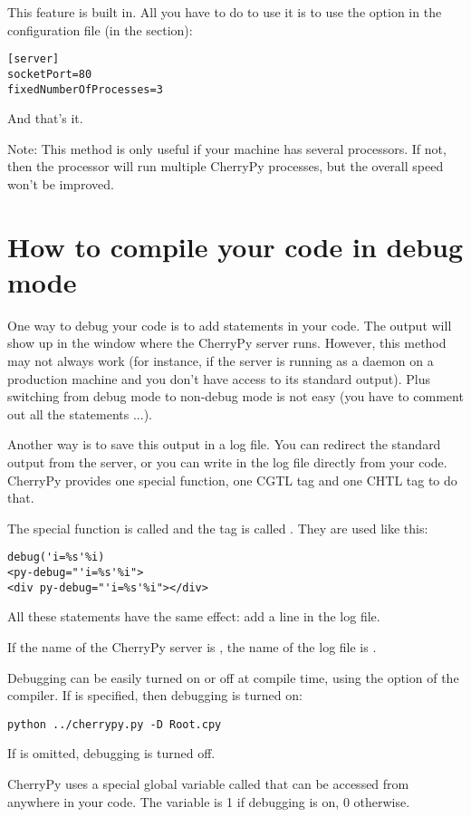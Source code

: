 \documentclass{manual}
\begin{document}
This feature is built in. All you have to do to use it is to use the  option in
the configuration file (in the \var{[server]} section):
\begin{verbatim}
[server]
socketPort=80
fixedNumberOfProcesses=3
\end{verbatim}
And that's it.

Note: This method is only useful if your machine has several processors. If not, then the processor will run multiple
CherryPy processes, but the overall speed won't be improved.

\chapter{How to compile your code in debug mode}
One way to debug your code is to add  statements in your code. The output will show up in the window
where the CherryPy server runs. However, this method may not always work (for instance, if the server is running
as a daemon on a production machine and you don't have access to its standard output). Plus switching from debug mode
to non-debug mode is not easy (you have to comment out all the  statements ...).

Another way is to save this output in a log file. You can redirect the standard output from the server, or you can write
in the log file directly from your code. CherryPy provides one special function, one CGTL tag and one CHTL tag to do that.

The special function is called  and the tag is called . They are used like this:
\begin{verbatim}
debug('i=%s'%i)
<py-debug="'i=%s'%i">
<div py-debug="'i=%s'%i"></div>
\end{verbatim}
All these statements have the same effect: add a line in the log file.

If the name of the CherryPy server is , the name of the log file is .

Debugging can be easily turned on or off at compile time, using the  option of the compiler.
If  is specified, then debugging is turned on:
\begin{verbatim}
python ../cherrypy.py -D Root.cpy
\end{verbatim}
If  is omitted, debugging is turned off.

CherryPy uses a special global variable called  that can be accessed from anywhere in your code. The variable
is 1 if debugging is on, 0 otherwise.
\end{document}
